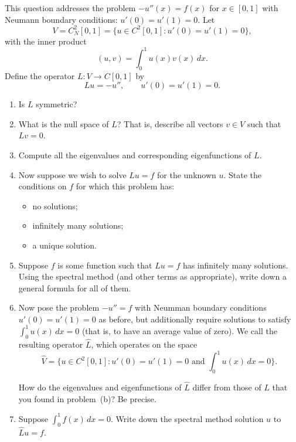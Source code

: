 This question addresses the problem $-u''(x) = f(x)$
for $x\in[0,1]$ with Neumann boundary conditions: $u'(0)=u'(1)=0$.  
Let 
\[ V = C^2_N[0,1] = \{ u \in C^2[0,1]: u'(0)=u'(1)=0\},\]
with the inner product
\[    (u,v) = \int_0^1 u(x) v(x)\,dx.\]
Define the operator $L:V \to C[0,1]$ by 
\[ Lu = -u'', \qquad u'(0)=u'(1)=0.\]

\begin{enumerate}
\item Is $L$ symmetric?

\vspace*{.5em}
\item What is the null space of $L$?  That is, describe all vectors 
      $v\in V$ such that $L v = 0$.

\vspace*{.5em}
\item Compute all the eigenvalues and corresponding eigenfunctions of $L$.

\vspace*{.5em}
\item Now suppose we wish to solve $Lu = f$ for the unknown $u$.  
      State the conditions on $f$ for which this problem has:
      \begin{itemize}
      \item no solutions;
      \item infinitely many solutions;
      \item a unique solution.
      \end{itemize}

\vspace*{.5em}
\item Suppose $f$ is some function such that $Lu = f$ has infinitely many solutions.\\
      Using the spectral method (and other terms as appropriate),
      write down a general formula for all of them.

\vspace*{.5em}
\item Now pose the problem $-u'' = f$ with Neumman boundary
      conditions $u'(0)=u'(1)=0$ as before, but additionally require solutions
      to satisfy $\int_0^1 u(x)\,dx = 0$ (that is, to have an average value of zero).   
      We call the resulting operator $\widehat{L}$, which operates on the space
      \[ \widehat{V} = \{ u \in C^2[0,1]: \mbox{$u'(0)=u'(1)=0$ and $\int_0^1 u(x)\,d x=0$}\}.\]

      How do the eigenvalues and eigenfunctions of $\widehat{L}$ differ
      from those of $L$ that you found in problem~(b)?
      Be precise.

\vspace*{.5em}
\item Suppose $\int_0^1 f(x)\,dx = 0$.  Write down the spectral method solution $u$ 
      to $\widehat{L} u = f$.



\end{enumerate}
